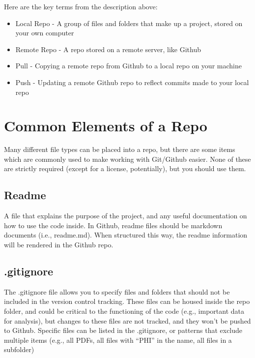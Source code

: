 \documentclass[
  letterpaper,
  DIV=11,
  numbers=noendperiod]{scrreprt}
\begin{document}
Here are the key terms from the description above:

\begin{itemize}
\item
  Local Repo - A group of files and folders that make up a project,
  stored on your own computer
\item
  Remote Repo - A repo stored on a remote server, like Github
\item
  Pull - Copying a remote repo from Github to a local repo on your
  machine
\item
  Push - Updating a remote Github repo to reflect commits made to your
  local repo
\end{itemize}

\hypertarget{common-elements-of-a-repo}{%
\section{Common Elements of a Repo}\label{common-elements-of-a-repo}}

Many different file types can be placed into a repo, but there are some
items which are commonly used to make working with Git/Github easier.
None of these are strictly required (except for a license, potentially),
but you should use them.

\hypertarget{readme}{%
\subsection{Readme}\label{readme}}

A file that explains the purpose of the project, and any useful
documentation on how to use the code inside. In Github, readme files
should be markdown documents (i.e., readme.md). When structured this
way, the readme information will be rendered in the Github repo.

\hypertarget{gitignore}{%
\subsection{.gitignore}\label{gitignore}}

The .gitignore file allows you to specify files and folders that should
not be included in the version control tracking. These files can be
housed inside the repo folder, and could be critical to the functioning
of the code (e.g., important data for analysis), but changes to these
files are not tracked, and they won't be pushed to Github. Specific
files can be listed in the .gitignore, or patterns that exclude multiple
items (e.g., all PDFs, all files with ``PHI'' in the name, all files in
a subfolder)
\end{document}
